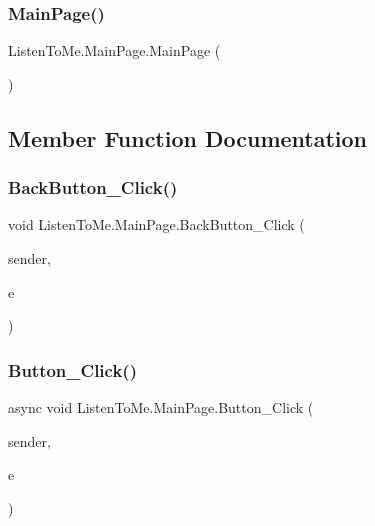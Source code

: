 \subsubsection{\texorpdfstring{Main\+Page()}{MainPage()}}
{\footnotesize\ttfamily Listen\+To\+Me.\+Main\+Page.\+Main\+Page (\begin{DoxyParamCaption}{ }\end{DoxyParamCaption})}



\subsection{Member Function Documentation}
\mbox{\label{class_listen_to_me_1_1_main_page_abf609ebc2f3561a5031ede871d605f4e}} 
\subsubsection{\texorpdfstring{Back\+Button\+\_\+\+Click()}{BackButton\_Click()}}
{\footnotesize\ttfamily void Listen\+To\+Me.\+Main\+Page.\+Back\+Button\+\_\+\+Click (\begin{DoxyParamCaption}\item[{object}]{sender,  }\item[{Routed\+Event\+Args}]{e }\end{DoxyParamCaption})\hspace{0.3cm}{\ttfamily [private]}}

\mbox{\label{class_listen_to_me_1_1_main_page_a5277043a631146593b3f10699577408f}} 
\subsubsection{\texorpdfstring{Button\+\_\+\+Click()}{Button\_Click()}}
{\footnotesize\ttfamily async void Listen\+To\+Me.\+Main\+Page.\+Button\+\_\+\+Click (\begin{DoxyParamCaption}\item[{object}]{sender,  }\item[{Routed\+Event\+Args}]{e }\end{DoxyParamCaption})\hspace{0.3cm}{\ttfamily [private]}}



